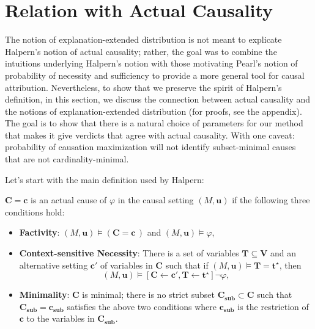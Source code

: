 \documentclass[anon,12pt]{clear2025} %
\begin{document}
\section{Relation with Actual Causality} \label{sec:relation_with_ac}

The notion of explanation-extended distribution is not meant to explicate Halpern's notion of actual causality; rather, the goal was to combine the intuitions underlying Halpern's notion with those motivating Pearl's notion of probability of necessity and sufficiency to provide a more general tool for causal attribution. Nevertheless, to show that we preserve the spirit of Halpern's definition, in this section, we discuss the connection between actual causality and the notions of explanation-extended distribution (for proofs, see the appendix). The goal is to show that there is a natural choice of parameters for our method that makes it give verdicts that agree with actual causality. With one caveat: probability of causation maximization will not identify subset-minimal causes that are not cardinality-minimal.



Let's start with the main definition used by Halpern:

\begin{definition} \label{def:ac}
    \(\mathbf{C} = \mathbf{c}\) is an actual cause of \(\varphi\) in the causal setting \((M, \mathbf{u})\) if the following three conditions hold:
    \begin{itemize}
        \item \textbf{Factivity}: \((M, \mathbf{u}) \vDash (\mathbf{C} = \mathbf{c}\,)\) and \((M, \mathbf{u}) \vDash \varphi\),
        \item \textbf{Context-sensitive Necessity}: There is a set of variables \(\mathbf{T} \subseteq \mathbf{V}\) and an alternative setting \(\mathbf{c'}\) of variables in \(\mathbf{C}\) such that if \((M, \mathbf{u}) \vDash \mathbf{T} = \mathbf{t^\star}\), then
            \[(M, \mathbf{u}) \vDash [\mathbf{C} \leftarrow \mathbf{c'}, \mathbf{T} \leftarrow \mathbf{t^\star}] \neg \varphi,\]
        \item \textbf{Minimality}: \(\mathbf{C}\) is minimal; there is no strict subset \(\mathbf{C_{sub}} \subset \mathbf{C}\) such that \(\mathbf{C_{sub}} = \mathbf{c_{sub}}\) satisfies the above two conditions where $\mathbf{c_{sub}}$ is the restriction of \(\mathbf{c}\) to the variables in \(\mathbf{C_{sub}}\). 
    \end{itemize}
\end{definition}
\end{document}

